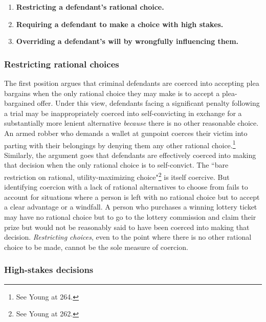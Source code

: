 \begin{enumerate}
    \item \textbf{Restricting a defendant's rational choice.}
    \item \textbf{Requiring a defendant to make a choice with high stakes.}
    \item \textbf{Overriding a defendant's will by wrongfully influencing them.}
\end{enumerate}

\subsubsection{Restricting rational choices}

The first position argues that criminal defendants are coerced into accepting plea bargains when the only rational choice they may make is to accept a plea-bargained offer. Under this view, defendants facing a significant penalty following a trial may be inappropriately coerced into self-convicting in exchange for a substantially more lenient alternative \textit{because} there is no other reasonable choice. An armed robber who demands a wallet at gunpoint coerces their victim into parting with their belongings by denying them any other rational choice.\footnote{See Young at 264.} Similarly, the argument goes that defendants are effectively coerced into making that decision when the only rational choice is to self-convict. The ``bare restriction on rational, utility-maximizing choice"\footnote{See Young at 262.} is itself coercive. But identifying coercion with a lack of rational alternatives to choose from fails to account for situations where a person is left with no rational choice but to accept a clear advantage or a windfall. A person who purchases a winning lottery ticket may have no rational choice but to go to the lottery commission and claim their prize but would not be reasonably said to have been coerced into making that decision. \textit{Restricting choices}, even to the point where there is no other rational choice to be made, cannot be the sole measure of coercion.

\subsubsection{High-stakes decisions}

